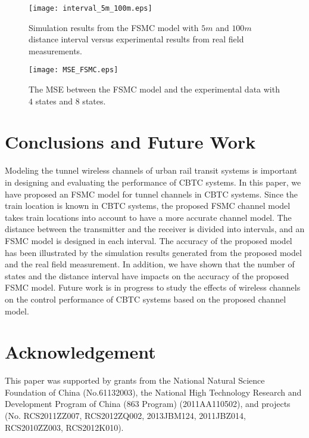 \documentclass[conference]{IEEEtran}
\begin{document}
\begin{figure}[tp]
\centering
\texttt{[image: interval\_5m\_100m.eps]}
\caption{Simulation results from the FSMC model with $5m$ and $100m$ distance interval versus experimental results from real field measurements.}
\label{5m}

\centering
\texttt{[image: MSE\_FSMC.eps]}
\caption{The MSE between the FSMC model and the experimental data with $4$ states and $8$ states.}
\label{MSE}
\end{figure}

\section{Conclusions and Future Work}
\label{Sec_CandF}
Modeling the tunnel wireless channels of urban rail transit systems is important in designing and evaluating the performance of CBTC systems. In this paper, we have proposed an FSMC model for tunnel channels in CBTC systems. Since the train location is known in CBTC systems, the proposed FSMC channel model takes train locations into account to have a more accurate channel model. The distance between the transmitter and the receiver is divided into intervals, and an FSMC model is designed in each interval. The accuracy of the proposed model has been illustrated by the simulation results generated from the proposed model and the real field measurement. In addition,  we have shown that the  number of states and the distance interval have impacts on the accuracy of the proposed FSMC model. Future work is in progress to study the effects of  wireless channels on the control performance of CBTC systems based on the proposed channel model.

\section*{Acknowledgement}This paper was supported by grants from the National Natural Science Foundation of China (No.61132003), the National High Technology Research and Development Program of China (863 Program) (2011AA110502), and projects (No. RCS2011ZZ007, RCS2012ZQ002, 2013JBM124, 2011JBZ014, RCS2010ZZ003, RCS2012K010).




\end{document}
